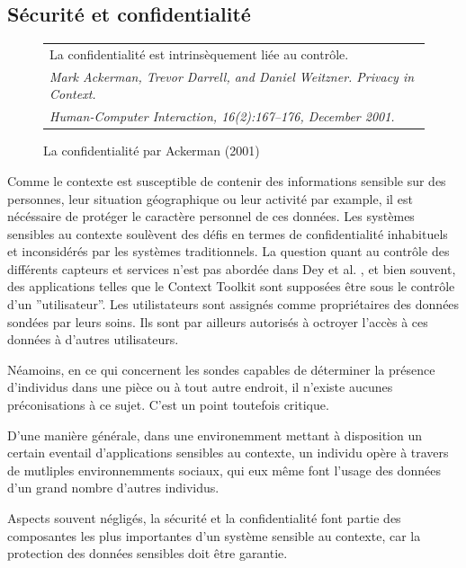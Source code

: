 \subsection{Sécurité et confidentialité}

\begin{figure}[h]
  \centering
  \begin{tabular}{l}
    La confidentialité est intrinsèquement liée au contrôle.
    \cite{ackerman_privacy_2001} \\
    \em \footnotesize Mark Ackerman, Trevor Darrell, and Daniel Weitzner. 
    Privacy in Context. \\
    \em \footnotesize Human-Computer Interaction, 16(2):167–176, December 2001.
    \\
  \end{tabular}
  \caption{La confidentialité par Ackerman (2001)}
  \label{fig:quote}
\end{figure}


Comme le contexte est susceptible de contenir des informations sensible sur des
personnes, leur situation géographique ou leur activité par example, il est
nécéssaire de protéger le caractère personnel de ces données. Les systèmes
sensibles au contexte soulèvent des défis en termes de confidentialité
inhabituels et inconsidérés par les systèmes traditionnels. La question quant au
contrôle des différents capteurs et services n'est pas abordée dans Dey et al.
\cite{dey_conceptual_2001}, et bien souvent, des applications telles que le
Context Toolkit sont supposées être sous le contrôle d'un ''utilisateur''. Les
utilistateurs sont assignés comme propriétaires des données sondées par leurs
soins. Ils sont par ailleurs autorisés à octroyer l'accès à ces données à
d'autres utilisateurs.

Néamoins, en ce qui concernent les sondes capables de déterminer la présence
d'individus dans une pièce ou à tout autre endroit, il n'existe aucunes
préconisations à ce sujet. C'est un point toutefois critique.

D'une manière générale, dans une environemment mettant à
disposition un certain eventail d'applications sensibles au contexte, un individu opère
à travers de mutliples environnemments sociaux, qui eux même font l'usage des
données d'un grand nombre d'autres individus.

Aspects souvent négligés, la sécurité et la confidentialité font partie des
composantes les plus importantes d'un système sensible au contexte, car la
protection des données sensibles doit être garantie.

